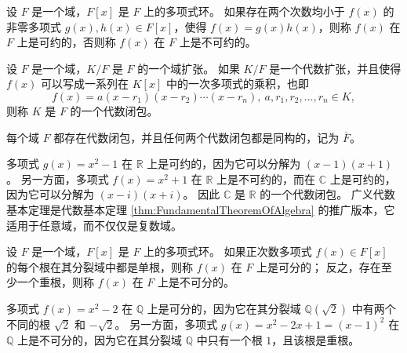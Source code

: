 \begin{definition}
    设 $F$ 是一个域，$F[x]$ 是 $F$ 上的多项式环。
    如果存在两个次数均小于 $f(x)$ 的非零多项式 $g(x),h(x)\in F[x]$，使得 $f(x)=g(x)h(x)$，则称 $f(x)$ 在 $F$ 上是可约的，否则称 $f(x)$ 在 $F$ 上是不可约的。
    \label{def:reducible_irreducible_polynomial}
\end{definition}

\begin{definition}
    设 $F$ 是一个域，$K/F$ 是 $F$ 的一个域扩张。
    如果 $K/F$ 是一个代数扩张，并且使得 $f(x)$ 可以写成一系列在 $K[x]$ 中的一次多项式的乘积，也即
    \[
        f(x) = a(x - r_1)(x - r_2) \cdots (x - r_n),\ a,r_1,r_2,\ldots,r_n \in K,
    \]
    则称 $K$ 是 $F$ 的一个代数闭包。
    \label{def:algebraic_closure}
\end{definition}

\begin{theorem}
    每个域 $F$ 都存在代数闭包，并且任何两个代数闭包都是同构的，记为 $\overline{F}$。
    \label{thm:FundamentalTheoremOfAlgebraicClosure}
\end{theorem}

\begin{note}
    多项式 $g(x)=x^2-1$ 在 $\mathbb{R}$ 上是可约的，因为它可以分解为 $(x-1)(x+1)$。
    另一方面，多项式 $f(x)=x^2+1$ 在 $\mathbb{R}$ 上是不可约的，而在 $\mathbb{C}$ 上是可约的，因为它可以分解为 $(x-i)(x+i)$。
    因此 $\mathbb{C}$ 是 $\mathbb{R}$ 的一个代数闭包。
    广义代数基本定理是代数基本定理 \ref{thm:FundamentalTheoremOfAlgebra} 的推广版本，它适用于任意域，而不仅仅是复数域。
\end{note}

\begin{definition}
    设 $F$ 是一个域，$F[x]$ 是 $F$ 上的多项式环。
    如果正次数多项式 $f(x)\in F[x]$ 的每个根在其分裂域中都是单根，则称 $f(x)$ 在 $F$ 上是可分的；
    反之，存在至少一个重根，则称 $f(x)$ 在 $F$ 上是不可分的。
    \label{def:separable_inseparable_polynomial}
\end{definition}
\begin{note}
    多项式 $f(x)=x^2-2$ 在 $\mathbb{Q}$ 上是可分的，因为它在其分裂域 $\mathbb{Q}(\sqrt{2})$ 中有两个不同的根 $\sqrt{2}$ 和 $-\sqrt{2}$。
    另一方面，多项式 $g(x)=x^2-2x+1=(x-1)^2$ 在 $\mathbb{Q}$ 上是不可分的，因为它在其分裂域 $\mathbb{Q}$ 中只有一个根 $1$，且该根是重根。
\end{note}
\vspace{1em}

